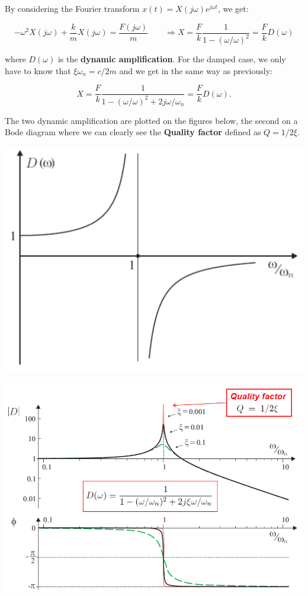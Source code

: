			By considering the Fourier transform $x(t) = X(j\omega )e^{j\omega t}$, we get:
			
			\begin{equation}
			-\omega ^2 X(j\omega) + \frac{k}{m} X(j\omega) = \frac{F(j\omega)}{m} \qquad \Rightarrow X = \frac{F}{k} \frac{1}{1-(\omega / \omega)^2} = \frac{F}{k} D(\omega)
			\end{equation}
			
			where $D(\omega)$ is the \textbf{dynamic amplification}. For the damped case, we only have to know that $\xi \omega _n = c/2m$ and we get in the same way as previously:
			
			\begin{equation}
			X = \frac{F}{k}\frac{1}{1-(\omega / \omega)^2 + 2j\omega / \omega _n } = \frac{F}{k} D(\omega).
			\end{equation}
			
			The two dynamic amplification are plotted on the figures below, the second on a Bode diagram where we can clearly see the \textbf{Quality factor} defined as $Q = 1/2\xi$. 
			
			\begin{center}
			\begin{minipage}{0.4\textwidth}
			\includegraphics[scale=0.4]{ch1/9}
			\end{minipage}
			\begin{minipage}{0.4\textwidth}
			\includegraphics[scale=0.24]{ch1/10}
			\end{minipage}
			\end{center}
